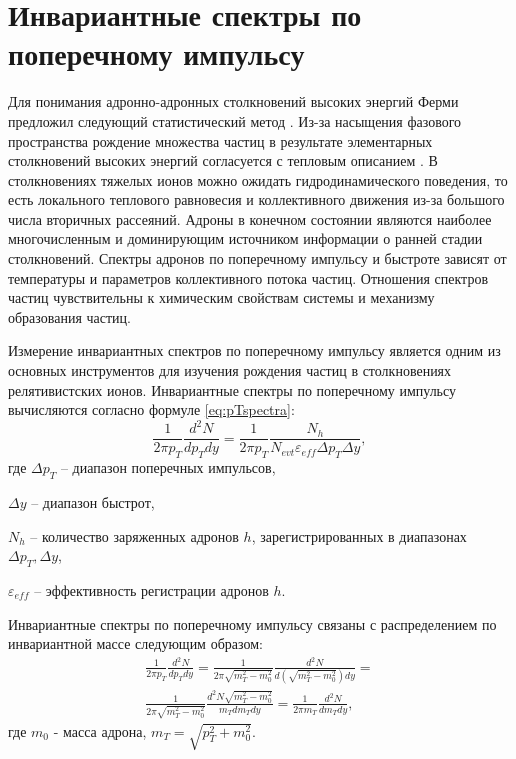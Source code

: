 \section{Инвариантные спектры по поперечному импульсу} \label{sectRes_spectra}
Для понимания адронно-адронных столкновений высоких энергий Ферми предложил следующий статистический метод \cite{ThermalModel}. Из-за насыщения фазового пространства рождение множества частиц в результате элементарных столкновений высоких энергий согласуется с тепловым описанием \cite{Thermal1, Thermal2, ThermalModel}. В столкновениях тяжелых ионов можно ожидать гидродинамического поведения, то есть локального теплового равновесия и коллективного движения из-за большого числа вторичных рассеяний. Адроны в конечном состоянии являются наиболее многочисленным и доминирующим источником информации о ранней стадии столкновений. Спектры адронов по поперечному импульсу и быстроте зависят от температуры и параметров коллективного потока частиц. Отношения спектров частиц чувствительны к химическим свойствам системы и механизму образования частиц.

Измерение инвариантных спектров по поперечному импульсу является одним из основных инструментов для изучения рождения частиц в столкновениях релятивистских ионов.
Инвариантные спектры по поперечному импульсу вычисляются согласно формуле \ref{eq:pTspectra}:
\begin{equation}
	\label{eq:pTspectra}
	\frac{1}{2\pi p_T} \frac{d^2 N}{dp_T dy}=\frac{1}{2\pi p_T}\frac{N_h}{N_{evt} \varepsilon_{eff} \Delta p_T \Delta y},
\end{equation}
где $\Delta p_T$ – диапазон поперечных импульсов,

$\Delta y$ – диапазон быстрот, 

$N_h$ -- количество заряженных адронов $h$, зарегистрированных в диапазонах  $\Delta p_T, \Delta y$,  

$\varepsilon_{eff}$ -- эффективность регистрации адронов $h$.

Инвариантные спектры по поперечному импульсу связаны с распределением по инвариантной массе следующим образом:
\begin{equation}
	\label{eq:mTspectra}
	\begin{split}
		\frac{1}{2\pi p_T} \frac{d^2 N}{dp_T dy}=
		\frac{1}{2\pi \sqrt{m_T^2-m_0^2}} \frac{d^2 N}{d(\sqrt{m_T^2-m_0^2})dy}=\\
		\frac{1}{2\pi \sqrt{m_T^2-m_0^2}} \frac{d^2 N \sqrt{m_T^2-m_0^2}}{m_T dm_Tdy}=\frac{1}{2\pi m_T} \frac{d^2 N}{dm_Tdy},
	\end{split}
\end{equation}
где $m_0$ - масса адрона, $m_T = \sqrt{p_{T}^{2}+m_0^2}$.


